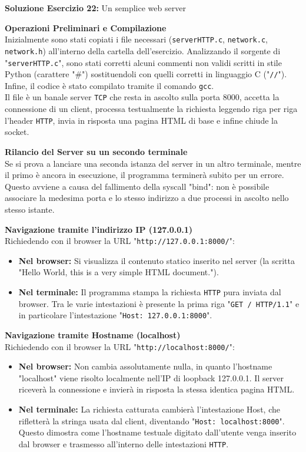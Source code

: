 \documentclass[11pt]{article}
\begin{document}
\begin{tcolorbox}[colback=green!5!white,colframe=green!75!black,title=\textbf{RISPOSTA}, breakable]
\textbf{Soluzione Esercizio 22:} Un semplice web server

\textbf{Operazioni Preliminari e Compilazione}\\
Inizialmente sono stati copiati i file necessari (\texttt{serverHTTP.c}, \texttt{network.c}, \texttt{network.h}) all'interno della cartella dell'esercizio. Analizzando il sorgente di "\texttt{serverHTTP.c}", sono stati corretti alcuni commenti non validi scritti in stile Python (carattere "\#") sostituendoli con quelli corretti in linguaggio C ("\texttt{//}"). Infine, il codice è stato compilato tramite il comando \texttt{gcc}.\\
Il file è un banale server \texttt{TCP} che resta in ascolto sulla porta 8000, accetta la connessione di un client, processa testualmente la richiesta leggendo riga per riga l'header \texttt{HTTP}, invia in risposta una pagina HTML di base e infine chiude la socket.

\textbf{Rilancio del Server su un secondo terminale}\\
Se si prova a lanciare una seconda istanza del server in un altro terminale, mentre il primo è ancora in esecuzione, il programma terminerà subito per un errore. Questo avviene a causa del fallimento della syscall "bind": non è possibile associare la medesima porta e lo stesso indirizzo a due processi in ascolto nello stesso istante.

\textbf{Navigazione tramite l'indirizzo IP (127.0.0.1)}\\
Richiedendo con il browser la URL "\texttt{http://127.0.0.1:8000/}":
\begin{itemize}
    \item \textbf{Nel browser:} Si visualizza il contenuto statico inserito nel server (la scritta "Hello World, this is a very simple HTML document.").
    \item \textbf{Nel terminale:} Il programma stampa la richiesta \texttt{HTTP} pura inviata dal browser. Tra le varie intestazioni è presente la prima riga "\texttt{GET / HTTP/1.1}" e in particolare l'intestazione "\texttt{Host: 127.0.0.1:8000}".
\end{itemize}

\textbf{Navigazione tramite Hostname (localhost)}\\
Richiedendo con il browser la URL "\texttt{http://localhost:8000/}":
\begin{itemize}
    \item \textbf{Nel browser:} Non cambia assolutamente nulla, in quanto l'hostname "localhost" viene risolto localmente nell'IP di loopback 127.0.0.1. Il server riceverà la connessione e invierà in risposta la stessa identica pagina HTML.
    \item \textbf{Nel terminale:} La richiesta catturata cambierà l'intestazione Host, che rifletterà la stringa usata dal client, diventando "\texttt{Host: localhost:8000}". Questo dimostra come l'hostname testuale digitato dall'utente venga inserito dal browser e trasmesso all'interno delle intestazioni \texttt{HTTP}.
\end{itemize}


\end{tcolorbox}
\end{document}
